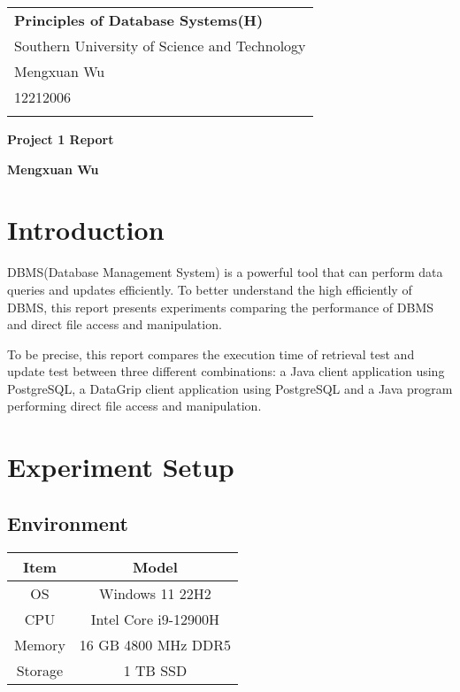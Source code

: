\documentclass[a4paper,12pt]{article}
\begin{document}
\thispagestyle{empty} %

\begin{tabular}{p{15.5cm}}
{\large \bf Principles of Database Systems(H)} \\
Southern University of Science and Technology \\ Mengxuan Wu \\ 12212006 \\
\hline
\\
\end{tabular}

\vspace*{0.3cm} %

\begin{center}
	{\Large \bf Project 1 Report}
	\vspace{2mm}

	{\bf Mengxuan Wu}
		
\end{center}  

\vspace{0.4cm}

\section{Introduction}
DBMS(Database Management System) is a powerful tool that can perform data queries and updates efficiently. 
To better understand the high efficiently of DBMS, this report presents experiments comparing the performance of DBMS and direct file access and manipulation. 

To be precise, this report compares the execution time of retrieval test and update test between three different combinations: 
a Java client application using PostgreSQL, a DataGrip client application using PostgreSQL and a Java program performing direct file access and manipulation.

\section{Experiment Setup}

\subsection{Environment}
\begin{center}
    \begin{tabular}{cc}
        \toprule
        Item & Model \\
        \midrule
        OS & Windows 11 22H2\\
        CPU & Intel Core i9-12900H\\
        Memory & 16 GB 4800 MHz DDR5\\
        Storage & 1 TB SSD\\
        \bottomrule
    \end{tabular}
\end{center}
\end{document}
